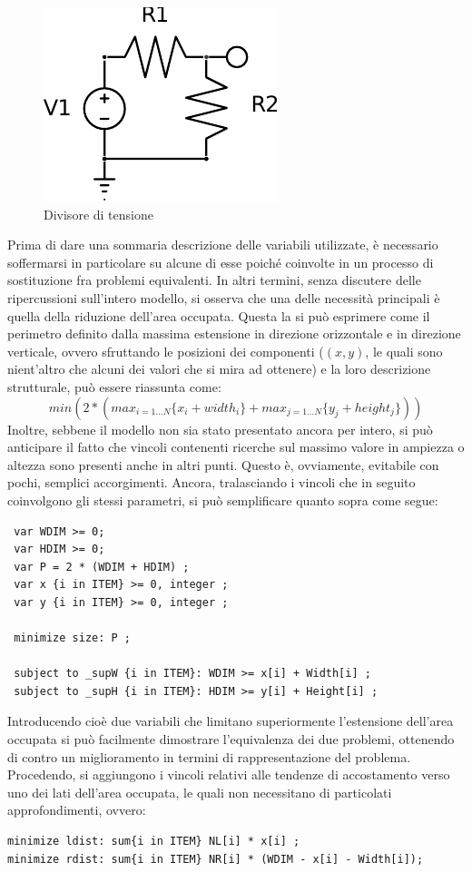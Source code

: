 \begin{figure}[ht]
 \centering
 \includegraphics[scale=1]{immagini/vdiv_schema.pdf}
 \caption{Divisore di tensione}
 \label{vdiv_schema}
\end{figure}

Prima di dare una sommaria descrizione delle variabili utilizzate, è necessario soffermarsi in particolare su alcune di esse poiché coinvolte in un processo di sostituzione fra problemi equivalenti. In altri termini, senza discutere delle ripercussioni sull'intero modello, si osserva che una delle necessità principali è quella della riduzione dell'area occupata. Questa la si può esprimere come il perimetro definito dalla massima estensione in direzione orizzontale e in direzione verticale, ovvero sfruttando le posizioni dei componenti ($ \left( x, y\right) $, le quali sono nient'altro che alcuni dei valori che si mira ad ottenere) e la loro descrizione strutturale, può essere riassunta come:
$$ min \left(2 \ast \left(max_{i = 1\dots N}\{ x_i + width_i\} + max_{j = 1\dots N}\{ y_j + height_j\} \right)\right) $$
Inoltre, sebbene il modello non sia stato presentato ancora per intero, si può anticipare il fatto che vincoli contenenti ricerche sul massimo valore in ampiezza o altezza sono presenti anche in altri punti. Questo è, ovviamente, evitabile con pochi, semplici accorgimenti. Ancora, tralasciando i vincoli che in seguito coinvolgono gli stessi parametri, si può semplificare quanto sopra come segue:
\small
\begin{verbatim}
 var WDIM >= 0;
 var HDIM >= 0;
 var P = 2 * (WDIM + HDIM) ;
 var x {i in ITEM} >= 0, integer ;
 var y {i in ITEM} >= 0, integer ;

 minimize size: P ;

 subject to _supW {i in ITEM}: WDIM >= x[i] + Width[i] ;
 subject to _supH {i in ITEM}: HDIM >= y[i] + Height[i] ;
\end{verbatim}
\normalsize

Introducendo cioè due variabili che limitano superiormente l'estensione dell'area occupata si può facilmente dimostrare l'equivalenza dei due problemi, ottenendo di contro un miglioramento in termini di rappresentazione del problema. Procedendo, si aggiungono i vincoli relativi alle tendenze di accostamento verso uno dei lati dell'area occupata, le quali non necessitano di particolati approfondimenti, ovvero:
\small
\begin{verbatim}
minimize ldist: sum{i in ITEM} NL[i] * x[i] ;
minimize rdist: sum{i in ITEM} NR[i] * (WDIM - x[i] - Width[i]); 
\end{verbatim}
\normalsize

